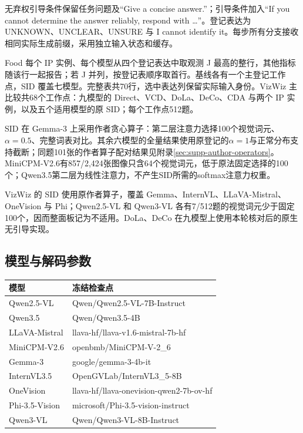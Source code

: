 无弃权引导条件保留任务问题及``Give a concise answer.''；引导条件加入``If you cannot determine the answer reliably, respond with \ldots''。登记表达为 UNKNOWN、UNCLEAR、UNSURE 与 I cannot identify it。每步所有分支接收相同实际生成前缀，采用独立输入状态和缓存。

Food 每个 IP 实例、每个模型从四个登记表达中取观测 J 最高的整行，其他指标随该行一起报告；若 J 并列，按登记表顺序取首行。基线各有一个主登记工作点，SID 覆盖七模型。完整表共70行，选中表达列保留实际输入身份。VizWiz 主比较共68个工作点：九模型的 Direct、VCD、DoLa、DeCo、CDA 与两个 IP 实例，以及五个适用模型的原 SID；每个工作点512题。

SID 在 Gemma-3 上采用作者贪心算子：第二层注意力选择100个视觉词元、$\alpha=0.5$、完整词表对比。其余六模型的全量结果使用原登记的$\alpha=1$与正常分布支持截断；同题101张的作者算子配对结果见附录\ref{sec:supp-author-operators}。MiniCPM-V2.6有857/2,424张图像只含64个视觉词元，低于原法固定选择的100个；Qwen3.5第二层为线性注意力，不产生SID所需的softmax注意力权重。

VizWiz 的 SID 使用原作者算子，覆盖 Gemma、InternVL、LLaVA-Mistral、OneVision 与 Phi；Qwen2.5-VL 和 Qwen3-VL 各有7/512题的视觉词元少于固定100个，因而整面板记为不适用。DoLa、DeCo 在九模型上使用本轮核对后的原生无引导实现。

\subsection{模型与解码参数}\label{ux6a21ux578bux4e0eux89e3ux7801ux53c2ux6570}

\begin{longtable}[]{@{}ll@{}}
\toprule\noalign{}
模型 & 冻结检查点 \\
\midrule\noalign{}
\endhead
\bottomrule\noalign{}
\endlastfoot
Qwen2.5-VL & Qwen/Qwen2.5-VL-7B-Instruct \\
Qwen3.5 & Qwen/Qwen3.5-4B \\
LLaVA-Mistral & llava-hf/llava-v1.6-mistral-7b-hf \\
MiniCPM-V2.6 & openbmb/MiniCPM-V-2\_6 \\
Gemma-3 & google/gemma-3-4b-it \\
InternVL3.5 & OpenGVLab/InternVL3\_5-8B \\
OneVision & llava-hf/llava-onevision-qwen2-7b-ov-hf \\
Phi-3.5-Vision & microsoft/Phi-3.5-vision-instruct \\
Qwen3-VL & Qwen/Qwen3-VL-8B-Instruct \\
\end{longtable}

